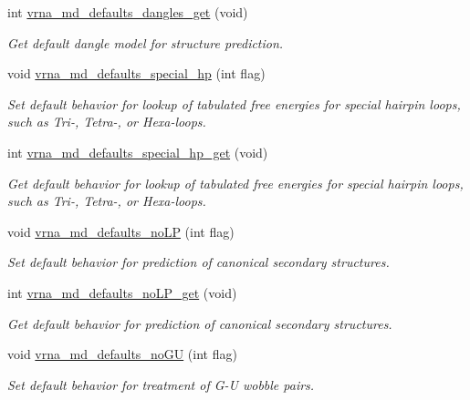 \begin{DoxyCompactItemize}
int \hyperlink{group__model__details_ga67ca06f95ae133778c79a4493c9817b8}{vrna\+\_\+md\+\_\+defaults\+\_\+dangles\+\_\+get} (void)
\begin{DoxyCompactList}\small\item\em Get default dangle model for structure prediction. \end{DoxyCompactList}\item 
void \hyperlink{group__model__details_gafff6449a02744add0308e653230c15fc}{vrna\+\_\+md\+\_\+defaults\+\_\+special\+\_\+hp} (int flag)
\begin{DoxyCompactList}\small\item\em Set default behavior for lookup of tabulated free energies for special hairpin loops, such as Tri-\/, Tetra-\/, or Hexa-\/loops. \end{DoxyCompactList}\item 
int \hyperlink{group__model__details_ga1d68a6efdaa1253cc63fd9cd06452559}{vrna\+\_\+md\+\_\+defaults\+\_\+special\+\_\+hp\+\_\+get} (void)
\begin{DoxyCompactList}\small\item\em Get default behavior for lookup of tabulated free energies for special hairpin loops, such as Tri-\/, Tetra-\/, or Hexa-\/loops. \end{DoxyCompactList}\item 
void \hyperlink{group__model__details_ga2f88ffc393ac9d7987849c965fd29ea8}{vrna\+\_\+md\+\_\+defaults\+\_\+no\+LP} (int flag)
\begin{DoxyCompactList}\small\item\em Set default behavior for prediction of canonical secondary structures. \end{DoxyCompactList}\item 
int \hyperlink{group__model__details_ga934344888fbacaed538bbbfe910f2aa6}{vrna\+\_\+md\+\_\+defaults\+\_\+no\+L\+P\+\_\+get} (void)
\begin{DoxyCompactList}\small\item\em Get default behavior for prediction of canonical secondary structures. \end{DoxyCompactList}\item 
void \hyperlink{group__model__details_ga98218f85c7a957a1d1ddf4627fdf5a39}{vrna\+\_\+md\+\_\+defaults\+\_\+no\+GU} (int flag)
\begin{DoxyCompactList}\small\item\em Set default behavior for treatment of G-\/U wobble pairs. \end{DoxyCompactList}\item 

\end{DoxyCompactItemize}
